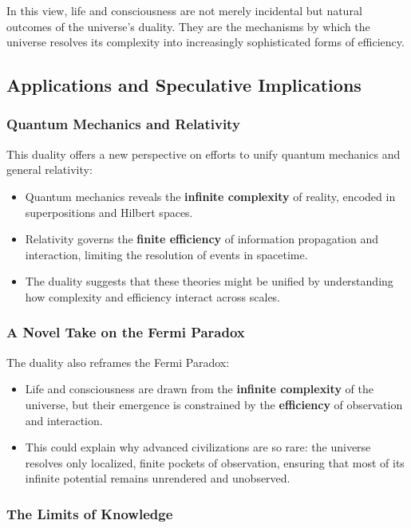 \documentclass[12pt]{article}
\begin{document}
In this view, life and consciousness are not merely incidental but natural outcomes of the universe's duality. They are the mechanisms by which the universe resolves its complexity into increasingly sophisticated forms of efficiency.

\subsection{Applications and Speculative Implications}

\subsubsection{Quantum Mechanics and Relativity}

This duality offers a new perspective on efforts to unify quantum mechanics and general relativity:
\begin{itemize}
    \item Quantum mechanics reveals the \textbf{infinite complexity} of reality, encoded in superpositions and Hilbert spaces.
    \item Relativity governs the \textbf{finite efficiency} of information propagation and interaction, limiting the resolution of events in spacetime.
    \item The duality suggests that these theories might be unified by understanding how complexity and efficiency interact across scales.
\end{itemize}

\subsubsection{A Novel Take on the Fermi Paradox}

The duality also reframes the Fermi Paradox:
\begin{itemize}
    \item Life and consciousness are drawn from the \textbf{infinite complexity} of the universe, but their emergence is constrained by the \textbf{efficiency} of observation and interaction.
    \item This could explain why advanced civilizations are so rare: the universe resolves only localized, finite pockets of observation, ensuring that most of its infinite potential remains unrendered and unobserved.
\end{itemize}

\subsubsection{The Limits of Knowledge}
\end{document}
